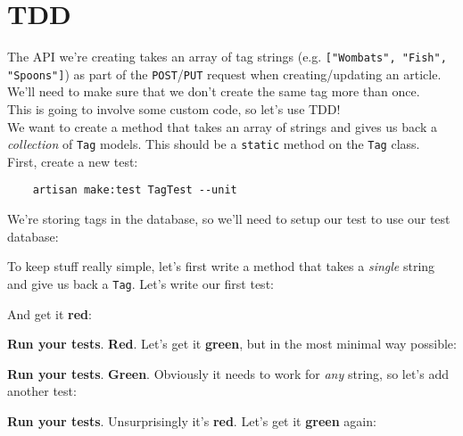 \section{TDD}

The API we're creating takes an array of tag strings (e.g. \texttt{["Wombats", "Fish", "Spoons"]}) as part of the \texttt{POST}/\texttt{PUT} request when creating/updating an article. We'll need to make sure that we don't create the same tag more than once.
\\

This is going to involve some custom code, so let's use TDD!
\\

We want to create a method that takes an array of strings and gives us back a \textit{collection} of \texttt{Tag} models. This should be a \texttt{static} method on the \texttt{Tag} class.
\\

First, create a new test:

\begin{verbatim}
    artisan make:test TagTest --unit
\end{verbatim}

We're storing tags in the database, so we'll need to setup our test to use our test database:



To keep stuff really simple, let's first write a method that takes a \textit{single} string and give us back a \texttt{Tag}. Let's write our first test:


And get it \textbf{red}:



\textbf{Run your tests}. \textbf{Red}. Let's get it \textbf{green}, but in the most minimal way possible:


\textbf{Run your tests}. \textbf{Green}. Obviously it needs to work for \textit{any} string, so let's add another test:


\textbf{Run your tests}. Unsurprisingly it's \textbf{red}. Let's get it \textbf{green} again:

